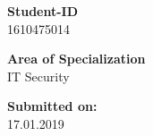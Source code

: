 \begin{center}
\vspace{0.65cm}

\hspace*{-1.0cm} \textbf{Student-ID}\\
\hspace*{-1.0cm} 1610475014 \\

\vspace{0.65cm}

\hspace*{-1.0cm} \textbf{Area of Specialization}\\
\hspace*{-1.0cm} IT Security \\






\vspace{1.4cm}

\hspace*{-1.0cm} \textbf{Submitted on:} \\
\hspace*{-1.0cm} 17.01.2019 \\

\end{center}










